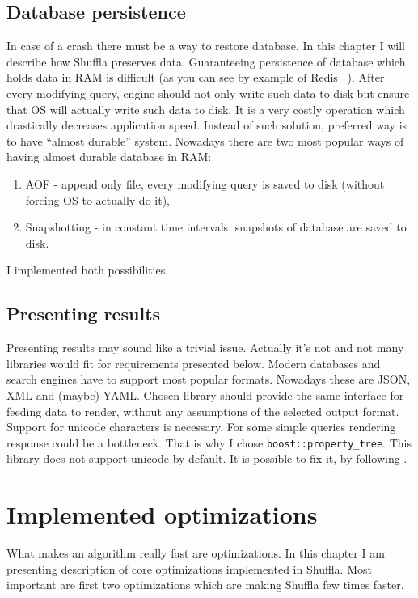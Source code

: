 \documentclass[10pt,a4paper]{article}
\begin{document}
\subsection{Database persistence}

In case of a crash there must be a way to restore database. In this chapter I will describe how Shuffla preserves data. Guaranteeing persistence of database which holds data in RAM is difficult (as you can see by example of Redis ~\cite{REDPE}). After every modifying query, engine should not only write such data to disk but ensure that OS will actually write such data to disk. It is a very costly operation which drastically decreases application speed. Instead of such solution, preferred way is to have “almost durable” system.
Nowadays there are two most popular ways of having almost durable database in RAM:

\begin{enumerate}
\item AOF - append only file, every modifying query is saved to disk (without forcing OS to actually do it),
\item Snapshotting - in constant time intervals, snapshots of database are saved to disk.
\end{enumerate}
I implemented both possibilities. 

\subsection{Presenting results}

Presenting results may sound like a trivial issue. Actually it's not and not many libraries would fit for requirements presented below. Modern databases and search engines have to support most popular formats. Nowadays these are JSON, XML and (maybe) YAML. Chosen library should provide the same interface for feeding data to render, without any assumptions of the selected output format. Support for unicode characters is necessary. For some simple queries rendering response could be a bottleneck. That is why I chose \verb|boost::property_tree|. This library does not support unicode by default. It is possible to fix it, by following \cite{SOANS} .

\section{Implemented optimizations}

What makes an algorithm really fast are optimizations. In this chapter I am presenting description of core optimizations implemented in Shuffla. Most important are first two optimizations which are making Shuffla few times faster.
\end{document}
